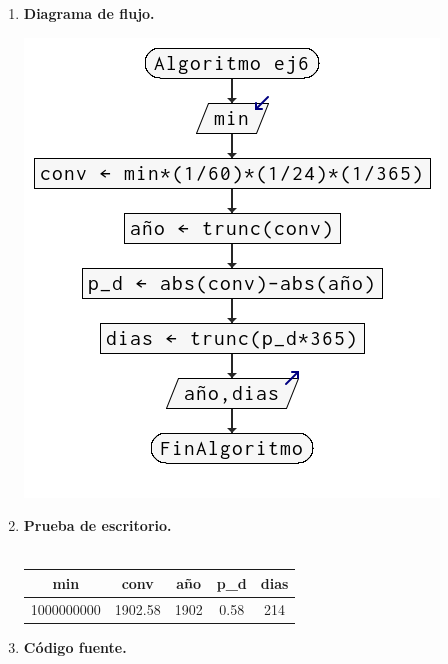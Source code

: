 \begin{enumerate}
\begin{enumerate}[\bfseries a)]
    \item \textbf{Diagrama de flujo.}\\
	\begin{center}
	    \includegraphics[scale=.7]{imagenes/tarea2/ej6df.png}
	\end{center}
	\vspace{1cm}

    \item \textbf{Prueba de escritorio.}\\\\
	\begin{center}
	    \begin{tabular}{c|c|c|c|c}
		min&conv&año&p\_d&dias\\
		\hline
		1000000000&1902.58&1902&0.58&214\\
	    \end{tabular}
	\end{center}
	\vspace{1cm}
    
    \item \textbf{Código fuente.}\\ 
	
	
	\vspace{1cm}
    

\end{enumerate}
\end{enumerate}
